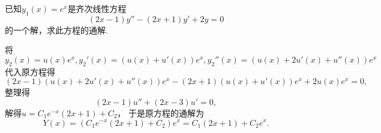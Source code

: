 \begin{example}
已知\(y_1(x) = e^x\)是齐次线性方程\[
	(2x-1)y'' - (2x+1)y' + 2y = 0
\]的一个解，求此方程的通解.
\begin{solution}
将\(y_2(x) = u(x) e^x,
y_2'(x) = (u(x) + u'(x)) e^x,
y_2''(x) = (u(x) + 2 u'(x) + u''(x)) e^x\)代入原方程得\[
	(2x-1) (u(x) + 2 u'(x) + u''(x)) e^x
	- (2x+1) (u(x) + u'(x)) e^x
	+ 2 u(x) e^x
	= 0,
\]
整理得\[
	(2x-1)u'' + (2x-3)u' = 0,
\]
解得\(u = C_1 e^{-x} (2x+1) + C_2\)，
于是原方程的通解为\[
	Y(x) = (C_1 e^{-x} (2x+1) + C_2) e^x
	= C_1 (2x+1) + C_2 e^x.
\]
\end{solution}
\end{example}
